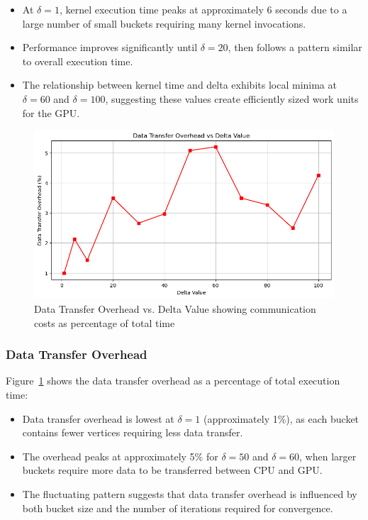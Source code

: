 \documentclass{article}
\begin{document}
\begin{itemize}
    \item At $\delta=1$, kernel execution time peaks at approximately 6 seconds due to a large number of small buckets requiring many kernel invocations.
    
    \item Performance improves significantly until $\delta=20$, then follows a pattern similar to overall execution time.
    
    \item The relationship between kernel time and delta exhibits local minima at $\delta=60$ and $\delta=100$, suggesting these values create efficiently sized work units for the GPU.
\end{itemize}

\begin{figure}[ht]
    \centering
    \includegraphics[width=\linewidth]{kernelOverhead.png}
    \caption{Data Transfer Overhead vs. Delta Value showing communication costs as percentage of total time}
    \label{fig:data_transfer}
\end{figure}

\subsubsection*{Data Transfer Overhead}

Figure~\ref{fig:data_transfer} shows the data transfer overhead as a percentage of total execution time:

\begin{itemize}
    \item Data transfer overhead is lowest at $\delta=1$ (approximately 1\%), as each bucket contains fewer vertices requiring less data transfer.
    
    \item The overhead peaks at approximately 5\% for $\delta=50$ and $\delta=60$, when larger buckets require more data to be transferred between CPU and GPU.
    
    \item The fluctuating pattern suggests that data transfer overhead is influenced by both bucket size and the number of iterations required for convergence.
\end{itemize}
\end{document}
